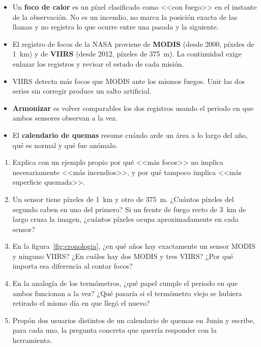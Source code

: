\resumen

\begin{itemize}
  \item Un \textbf{foco de calor} es un píxel clasificado como <<con fuego>> en el instante de
  la observación. No es un incendio, no marca la posición exacta de las llamas y no registra lo
  que ocurre entre una pasada y la siguiente.
  \item El registro de focos de la NASA proviene de \textbf{MODIS} (desde 2000, píxeles de
  1~km) y de \textbf{VIIRS} (desde 2012, píxeles de 375~m). La continuidad exige enlazar los registros y revisar el estado de cada misión.
  \item VIIRS detecta más focos que MODIS ante los mismos fuegos. Unir las dos series sin
  corregir produce un salto artificial.
  \item \textbf{Armonizar} es volver comparables los dos registros usando el periodo en que
  ambos sensores observan a la vez.
  \item El \textbf{calendario de quemas} resume cuándo arde un área a lo largo del año, qué es
  normal y qué fue anómalo.
\end{itemize}

\ejercicios

\begin{enumerate}
  \item Explica con un ejemplo propio por qué <<más focos>> no implica necesariamente <<más
  incendios>>, y por qué tampoco implica <<más superficie quemada>>.
  \item Un sensor tiene píxeles de 1~km y otro de 375~m. ¿Cuántos píxeles del segundo caben en
  uno del primero? Si un frente de fuego recto de 3~km de largo cruza la imagen, ¿cuántos
  píxeles ocupa aproximadamente en cada sensor?
  \item En la figura~\ref{fig:cronologia}, ¿en qué años hay exactamente un sensor MODIS y
  ninguno VIIRS? ¿En cuáles hay dos MODIS y tres VIIRS? ¿Por qué importa esa diferencia al
  contar focos?
  \item En la analogía de los termómetros, ¿qué papel cumple el periodo en que ambos funcionan
  a la vez? ¿Qué pasaría si el termómetro viejo se hubiera retirado el mismo día en que llegó
  el nuevo?
  \item Propón dos usuarios distintos de un calendario de quemas en Junín y escribe, para cada
  uno, la pregunta concreta que querría responder con la herramienta.
\end{enumerate}
